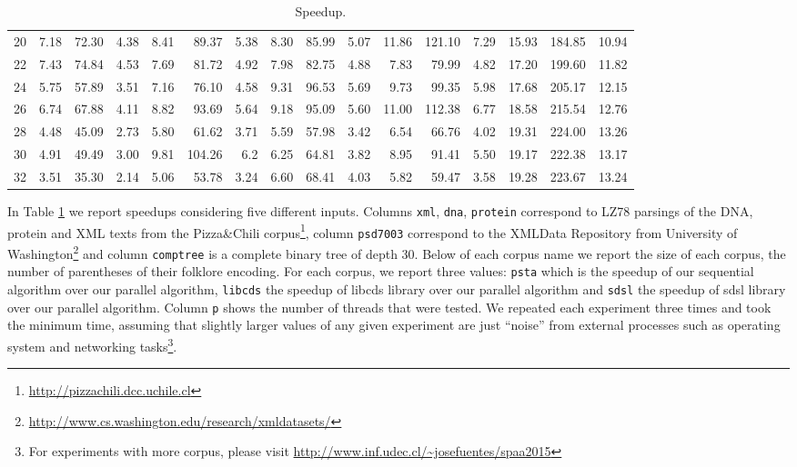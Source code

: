 \begin{table}[ht]
\begin{tabular}{crrrrrrrrrrrrrrr}
 20  &  7.18 &  72.30 & 4.38 &  8.41 & 89.37  & 5.38 &  8.30  & 85.99  & 5.07 &  11.86 &  121.10 &  7.29  & 15.93 & 184.85 & 10.94\\
 22  &  7.43 &  74.84 & 4.53 &  7.69 & 81.72  & 4.92 &  7.98  & 82.75  & 4.88 &  7.83  &  79.99  &  4.82  & 17.20 & 199.60 & 11.82\\
 24  &  5.75 &  57.89 & 3.51 &  7.16 & 76.10  & 4.58 &  9.31  & 96.53  & 5.69 &  9.73  &  99.35  &  5.98  & 17.68 & 205.17 & 12.15\\
 26  &  6.74 &  67.88 & 4.11 &  8.82 & 93.69  & 5.64 &  9.18  & 95.09  & 5.60 &  11.00 &  112.38 &  6.77  & 18.58 & 215.54 & 12.76\\
 28  &  4.48 &  45.09 & 2.73 &  5.80 & 61.62  & 3.71 &  5.59  & 57.98  & 3.42 &  6.54  &  66.76  &  4.02  & 19.31 & 224.00 & 13.26\\
 30  &  4.91 &  49.49 & 3.00 &  9.81 & 104.26 & 6.2  &  6.25  & 64.81  & 3.82 &  8.95  &  91.41  &  5.50  & 19.17 & 222.38 & 13.17\\
 32  &  3.51 &  35.30 & 2.14 &  5.06 & 53.78  & 3.24 &  6.60  & 68.41  & 4.03 &  5.82  &  59.47  &  3.58  & 19.28 & 223.67 & 13.24\\
 \hline
\end{tabular}
\caption{Speedup.}
\label{tbl:speedup}
\end{table}


In Table \ref{tbl:speedup} we report speedups considering five different inputs. Columns \verb+xml+, \verb+dna+, \verb+protein+ correspond to LZ78 parsings of the DNA, protein and XML texts from the Pizza\&Chili corpus\footnote{\url{http://pizzachili.dcc.uchile.cl}}, column \verb+psd7003+ correspond to the XMLData Repository from University of Washington\footnote{\url{http://www.cs.washington.edu/research/xmldatasets/}} and column \verb+comptree+ is a complete binary tree of depth 30. Below of each corpus name we report the size of each corpus, the number of parentheses of their folklore encoding. For each corpus, we report three values: \verb+psta+ which is the speedup of our sequential algorithm over our parallel algorithm, \verb+libcds+ the speedup of libcds library over our parallel algorithm and \verb+sdsl+ the speedup of sdsl library over our parallel algorithm. Column \verb+p+ shows the number of threads that were tested. We repeated each experiment three times and took the minimum time, assuming that slightly larger values of any given experiment are just ``noise'' from external processes such as operating system and networking tasks\footnote{For experiments with more corpus, please visit \url{http://www.inf.udec.cl/~josefuentes/spaa2015}}.

